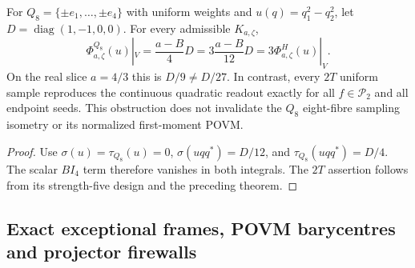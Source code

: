\documentclass[11pt,a4paper]{article}
\begin{document}
\begin{corollary}
\label{p2c:cor:v268-q8-endpoint-factor-three}
For $Q_8=\{\pm e_1,\ldots,\pm e_4\}$ with uniform weights and
$u(q)=q_1^2-q_2^2$, let $D=\operatorname{diag}(1,-1,0,0)$.
For every admissible $K_{a,\zeta}$,
\[
 \Phi_{a,\zeta}^{Q_8}(u)|_V=\frac{a-B}{4}D
   =3\frac{a-B}{12}D=3\Phi_{a,\zeta}^{H}(u)|_V.
\]
On the real slice $a=4/3$ this is $D/9\ne D/27$.
In contrast, every $2T$ uniform sample reproduces the continuous
quadratic readout exactly for all $f\in\mathcal P_2$ and all endpoint
seeds.  This obstruction does not invalidate the $Q_8$ eight-fibre
sampling isometry or its normalized first-moment POVM.
\end{corollary}
\begin{proof}
Use $\sigma(u)=\tau_{Q_8}(u)=0$,
$\sigma(uqq^*)=D/12$, and
$\tau_{Q_8}(uqq^*)=D/4$.  The scalar $B I_4$ term therefore vanishes
in both integrals.  The $2T$ assertion follows from its strength-five
design and the preceding theorem.
\end{proof}



\subsection{Exact exceptional frames, POVM barycentres and projector firewalls}
\label{p2f:sec:v273-exceptional-superposition}
\end{document}
